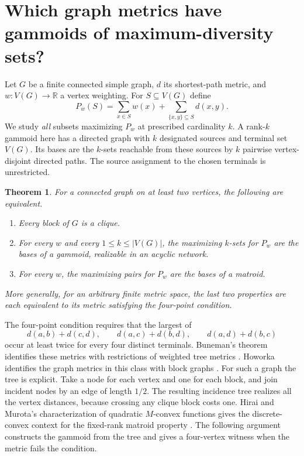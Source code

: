 \documentclass[11pt,a4paper]{article}
\newtheorem{theorem}{Theorem}[section]
\begin{document}
\section{Which graph metrics have gammoids of maximum-diversity sets?}
\label{sec:block-gammoids}
Let $G$ be a finite connected simple graph, $d$ its shortest-path metric, and
$w:V(G)\to\mathbb R$ a vertex weighting. For $S\subseteq V(G)$ define
\[
 P_w(S)=\sum_{x\in S}w(x)+\sum_{\{x,y\}\subseteq S}d(x,y).
\]
We study \emph{all} subsets maximizing $P_w$ at prescribed cardinality $k$.
A rank-$k$ gammoid here has a directed graph with $k$ designated sources
and terminal set $V(G)$. Its bases are the $k$-sets reachable from these
sources by $k$ pairwise vertex-disjoint directed paths. The source
assignment to the chosen terminals is unrestricted.

\begin{theorem}\label{thm:block-gammoid}
For a connected graph on at least two vertices, the following are equivalent.
\begin{enumerate}
\item Every block of $G$ is a clique.
\item For every $w$ and every $1\le k\le |V(G)|$, the maximizing $k$-sets
for $P_w$ are the bases of a gammoid, realizable in an acyclic network.
\item For every $w$, the maximizing pairs for $P_w$ are the bases of a matroid.
\end{enumerate}
More generally, for an arbitrary finite metric space, the last two
properties are each equivalent to its metric satisfying the four-point
condition.
\end{theorem}

The four-point condition requires that the largest of
\[
 d(a,b)+d(c,d),\qquad d(a,c)+d(b,d),\qquad d(a,d)+d(b,c)
\]
occur at least twice for every four distinct terminals. Buneman's theorem
identifies these metrics with restrictions of weighted tree metrics
\cite{blockbuneman}. Howorka identifies the graph metrics in this class
with block graphs \cite{blockhoworka}. For such a graph the tree is explicit.
Take a node for each vertex and one for each block, and join incident nodes
by an edge of length $1/2$. The resulting incidence tree realizes all the
vertex distances, because crossing any clique block costs one.
Hirai and Murota's characterization of quadratic $M$-convex functions
gives the discrete-convex context for the fixed-rank matroid property
\cite{blockhirai}. The following argument constructs the gammoid from
the tree and gives a four-vertex witness when the metric fails the
condition.
\end{document}

